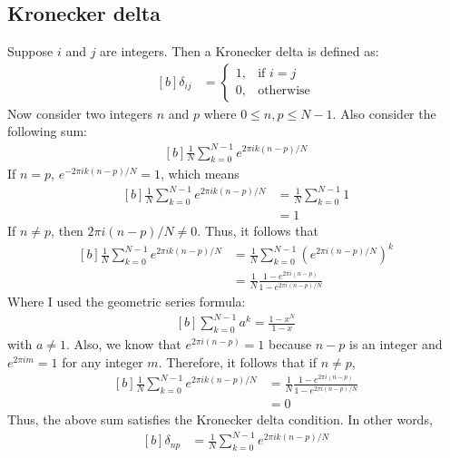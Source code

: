 \documentclass[letterpaper, 11pt]{article}
\newcommand{\ssum}[1]{\sum_{#1 = 0}^{N - 1}} %
\numberwithin{equation}{section}
\numberwithin{figure}{section}
\numberwithin{table}{section}
\begin{document}
\subsection{Kronecker delta}
Suppose \(i\) and \(j\) are integers. Then a Kronecker delta is defined as:
\begin{equation}
	\begin{aligned}[b]
		\delta_{ij}	&=\begin{cases}
				1, 	&\text{if } i=j\\
				0,	&\text{otherwise}
		\end{cases}
	\end{aligned}
\end{equation}
Now consider two integers \(n\) and \(p\) where \(0 \leq n,p \leq N-1\). Also consider the following sum:
\begin{equation}
	\begin{aligned}[b]
		\frac{1}{N}\ssum{k} e^{2\pi ik(n - p)/N} 
	\end{aligned}
\end{equation}
If \(n = p\), \(e^{-2\pi ik(n - p)/N} = 1\), which means
\begin{equation}
	\begin{aligned}[b]
		\frac{1}{N}\ssum{k} e^{2\pi ik(n - p)/N}
			&= \frac{1}{N}\ssum{k} 1\\
			&= 1
	\end{aligned}
\end{equation}
If \(n \neq p\), then \(2\pi i(n - p)/N \neq 0\). Thus, it follows that
\begin{equation}
	\begin{aligned}[b]
		\frac{1}{N}\ssum{k} e^{2\pi ik(n - p)/N}
			&= \frac{1}{N}\ssum{k} (e^{2\pi i(n - p)/N})^{k}\\
			&= \frac{1}{N}\frac{1 - e^{2\pi i(n - p)}}{1 - e^{2\pi i(n - p)/N}}
	\end{aligned}
\end{equation}
Where I used the geometric series formula:
\begin{equation}
	\begin{aligned}[b]
		\ssum{k} a^{k} = \frac{1 - x^{N}}{1 - x}
	\end{aligned}
\end{equation}
with \(a \neq 1\). Also, we know that \(e^{2\pi i(n - p)} = 1\) because \(n - p\) is an integer and \(e^{2\pi im} = 1\) for any integer \(m\). Therefore, it follows that if \(n \neq p\),
\begin{equation}
	\begin{aligned}[b]
		\frac{1}{N}\ssum{k} e^{2\pi ik(n - p)/N}
			&= \frac{1}{N}\frac{1 - e^{2\pi i(n - p)}}{1 - e^{2\pi i(n - p)/N}}\\
			&= 0
	\end{aligned}
\end{equation}
Thus, the above sum satisfies the Kronecker delta condition. In other words,
\begin{equation}
	\begin{aligned}[b]
		\delta_{np}	&= \frac{1}{N}\ssum{k} e^{2\pi ik(n - p)/N}
				\label{eq:kronecker}
	\end{aligned}
\end{equation}
\end{document}
